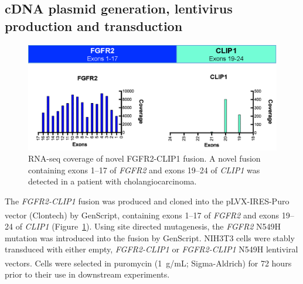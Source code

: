 \subsection{cDNA plasmid generation, lentivirus production and transduction}
\begin{figure}[htp]
	\centering
	\includegraphics[width=0.8\linewidth,keepaspectratio]{images/240/fusion_coverage}
	\caption[RNA-seq coverage of novel FGFR2-CLIP1 fusion.]{RNA-seq coverage of novel FGFR2-CLIP1 fusion. A novel fusion containing exons 1--17 of \textit{FGFR2} and exons 19--24 of \textit{CLIP1} was detected in a patient with cholangiocarcinoma.}
	\label{fig:240:fusion_coverage}
\end{figure}
The \textit{FGFR2-CLIP1} fusion was produced and cloned into the pLVX-IRES-Puro vector (Clontech) by GenScript\textsuperscript\textregistered{}, containing exons 1--17 of \textit{FGFR2} and exons 19--24 of \textit{CLIP1} (Figure~\ref{fig:240:fusion_coverage}). Using site directed mutagenesis, the \textit{FGFR2} N549H mutation was introduced into the fusion by GenScript. NIH3T3 cells were stably transduced with either empty, \textit{FGFR2-CLIP1} or \textit{FGFR2-CLIP1} N549H lentiviral vectors. Cells were selected in puromycin (1~\textmu{}g/mL; Sigma-Aldrich\textsuperscript\textregistered{}) for 72 hours prior to their use in downstream experiments.

